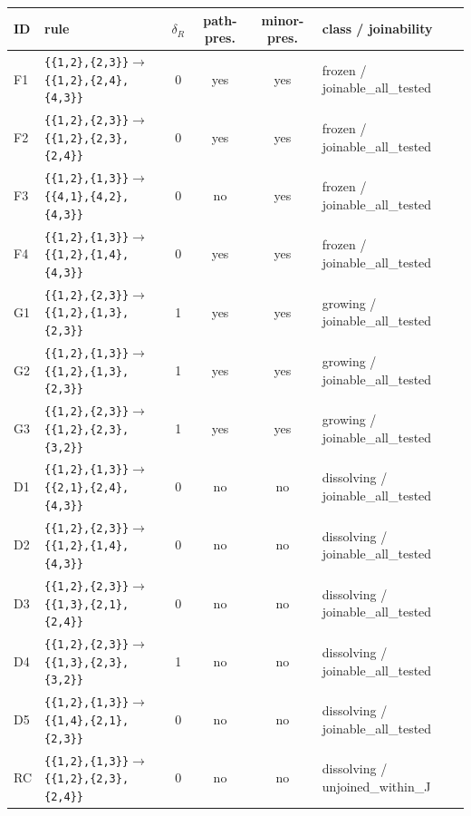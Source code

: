 \begin{tabular}{llcccl}
\toprule
ID & rule & $\delta_R$ & path-pres. & minor-pres. & class / joinability\\
\midrule
F1 & \texttt{\{\{1,2\},\{2,3\}\}$\to$\{\{1,2\},\{2,4\},\{4,3\}\}} & 0 & yes & yes & frozen / joinable\_all\_tested\\
F2 & \texttt{\{\{1,2\},\{2,3\}\}$\to$\{\{1,2\},\{2,3\},\{2,4\}\}} & 0 & yes & yes & frozen / joinable\_all\_tested\\
F3 & \texttt{\{\{1,2\},\{1,3\}\}$\to$\{\{4,1\},\{4,2\},\{4,3\}\}} & 0 & no & yes & frozen / joinable\_all\_tested\\
F4 & \texttt{\{\{1,2\},\{1,3\}\}$\to$\{\{1,2\},\{1,4\},\{4,3\}\}} & 0 & yes & yes & frozen / joinable\_all\_tested\\
G1 & \texttt{\{\{1,2\},\{2,3\}\}$\to$\{\{1,2\},\{1,3\},\{2,3\}\}} & 1 & yes & yes & growing / joinable\_all\_tested\\
G2 & \texttt{\{\{1,2\},\{1,3\}\}$\to$\{\{1,2\},\{1,3\},\{2,3\}\}} & 1 & yes & yes & growing / joinable\_all\_tested\\
G3 & \texttt{\{\{1,2\},\{2,3\}\}$\to$\{\{1,2\},\{2,3\},\{3,2\}\}} & 1 & yes & yes & growing / joinable\_all\_tested\\
D1 & \texttt{\{\{1,2\},\{1,3\}\}$\to$\{\{2,1\},\{2,4\},\{4,3\}\}} & 0 & no & no & dissolving / joinable\_all\_tested\\
D2 & \texttt{\{\{1,2\},\{2,3\}\}$\to$\{\{1,2\},\{1,4\},\{4,3\}\}} & 0 & no & no & dissolving / joinable\_all\_tested\\
D3 & \texttt{\{\{1,2\},\{2,3\}\}$\to$\{\{1,3\},\{2,1\},\{2,4\}\}} & 0 & no & no & dissolving / joinable\_all\_tested\\
D4 & \texttt{\{\{1,2\},\{2,3\}\}$\to$\{\{1,3\},\{2,3\},\{3,2\}\}} & 1 & no & no & dissolving / joinable\_all\_tested\\
D5 & \texttt{\{\{1,2\},\{1,3\}\}$\to$\{\{1,4\},\{2,1\},\{2,3\}\}} & 0 & no & no & dissolving / joinable\_all\_tested\\
RC & \texttt{\{\{1,2\},\{1,3\}\}$\to$\{\{1,2\},\{2,3\},\{2,4\}\}} & 0 & no & no & dissolving / unjoined\_within\_J\\
\bottomrule
\end{tabular}
